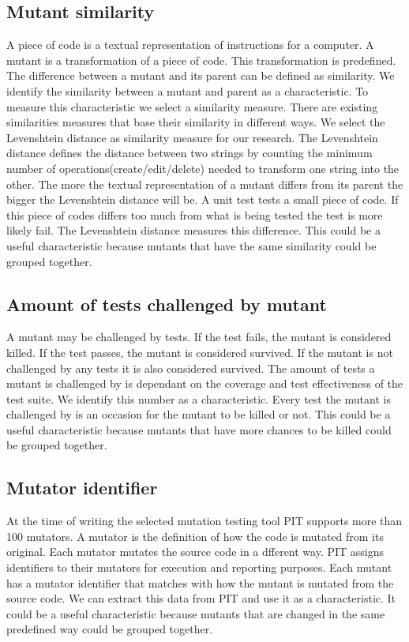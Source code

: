 \documentclass[../main]{subfiles}
\begin{document}
\subsection{Mutant similarity}
A piece of code is a textual representation of instructions for a computer.
A mutant is a transformation of a piece of code.
This transformation is predefined.
The difference between a mutant and its parent can be defined as similarity.
We identify the similarity between a mutant and parent as a characteristic.
\newline
To measure this characteristic we select a similarity measure.
There are existing similarities measures that base their similarity in different ways\cite{Gomma2013AApproaches}. 
We select the Levenshtein distance as similarity measure for our research\cite{Gomma2013AApproaches}.
The Levenshtein distance defines the distance between two strings by counting the minimum number of operations(create/edit/delete) needed to transform one string into the other\cite{Gomma2013AApproaches}.
The more the textual representation of a mutant differs from its parent the bigger the Levenshtein distance will be.
A unit test tests a small piece of code.
If this piece of codes differs too much from what is being tested the test is more likely fail. 
The Levenshtein distance measures this difference.
This could be a useful characteristic because mutants that have the same similarity could be grouped together.

\subsection{Amount of tests challenged by mutant}
A mutant may be challenged by tests.
If the test fails, the mutant is considered killed.
If the test passes, the mutant is considered survived.
If the mutant is not challenged by any tests it is also considered survived.
The amount of tests a mutant is challenged by is dependant on the coverage and test effectiveness of the test suite.
We identify this number as a characteristic.
Every test the mutant is challenged by is an occasion for the mutant to be killed or not.
This could be a useful characteristic because mutants that have more chances to be killed could be grouped together.

\subsection{Mutator identifier}
At the time of writing the selected mutation testing tool PIT supports more than 100 mutators\cite{pitestMutators}.
A mutator is the definition of how the code is mutated from its original\cite{Offutt2001}.
Each mutator mutates the source code in a dfferent way.
PIT assigns identifiers to their mutators for execution and reporting purposes. 
Each mutant has a mutator identifier that matches with how the mutant is mutated from the source code.
We can extract this data from PIT and use it as a characteristic.
It could be a useful characteristic because mutants that are changed in the same predefined way could be grouped together.
\end{document}
